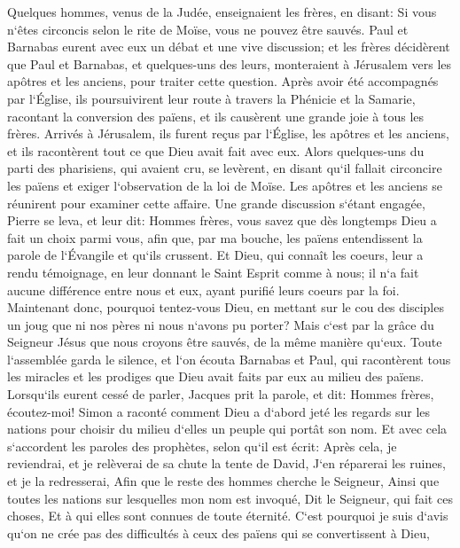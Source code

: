 \verse Quelques hommes, venus de la Judée, enseignaient les frères, en disant: Si vous n`êtes circoncis selon le rite de Moïse, vous ne pouvez être sauvés. 
\verse Paul et Barnabas eurent avec eux un débat et une vive discussion; et les frères décidèrent que Paul et Barnabas, et quelques-uns des leurs, monteraient à Jérusalem vers les apôtres et les anciens, pour traiter cette question. 
\verse Après avoir été accompagnés par l`Église, ils poursuivirent leur route à travers la Phénicie et la Samarie, racontant la conversion des païens, et ils causèrent une grande joie à tous les frères. 
\verse Arrivés à Jérusalem, ils furent reçus par l`Église, les apôtres et les anciens, et ils racontèrent tout ce que Dieu avait fait avec eux. 
\verse Alors quelques-uns du parti des pharisiens, qui avaient cru, se levèrent, en disant qu`il fallait circoncire les païens et exiger l`observation de la loi de Moïse. 
\verse Les apôtres et les anciens se réunirent pour examiner cette affaire. 
\verse Une grande discussion s`étant engagée, Pierre se leva, et leur dit: Hommes frères, vous savez que dès longtemps Dieu a fait un choix parmi vous, afin que, par ma bouche, les païens entendissent la parole de l`Évangile et qu`ils crussent. 
\verse Et Dieu, qui connaît les coeurs, leur a rendu témoignage, en leur donnant le Saint Esprit comme à nous; 
\verse il n`a fait aucune différence entre nous et eux, ayant purifié leurs coeurs par la foi. 
\verse Maintenant donc, pourquoi tentez-vous Dieu, en mettant sur le cou des disciples un joug que ni nos pères ni nous n`avons pu porter? 
\verse Mais c`est par la grâce du Seigneur Jésus que nous croyons être sauvés, de la même manière qu`eux. 
\verse Toute l`assemblée garda le silence, et l`on écouta Barnabas et Paul, qui racontèrent tous les miracles et les prodiges que Dieu avait faits par eux au milieu des païens. 
\verse Lorsqu`ils eurent cessé de parler, Jacques prit la parole, et dit: Hommes frères, écoutez-moi! 
\verse Simon a raconté comment Dieu a d`abord jeté les regards sur les nations pour choisir du milieu d`elles un peuple qui portât son nom. 
\verse Et avec cela s`accordent les paroles des prophètes, selon qu`il est écrit: 
\verse Après cela, je reviendrai, et je relèverai de sa chute la tente de David, J`en réparerai les ruines, et je la redresserai, 
\verse Afin que le reste des hommes cherche le Seigneur, Ainsi que toutes les nations sur lesquelles mon nom est invoqué, Dit le Seigneur, qui fait ces choses, 
\verse Et à qui elles sont connues de toute éternité. 
\verse C`est pourquoi je suis d`avis qu`on ne crée pas des difficultés à ceux des païens qui se convertissent à Dieu, 
